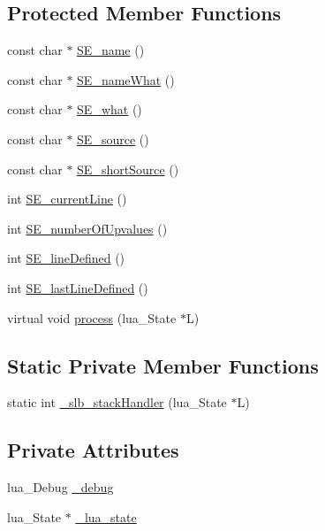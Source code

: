 \subsection*{Protected Member Functions}
\begin{DoxyCompactItemize}
\item 
const char $\ast$ \hyperlink{classSLB_1_1ErrorHandler_aa3f338107ee43be8294e11fb0ea6e207}{S\+E\+\_\+name} ()
\item 
const char $\ast$ \hyperlink{classSLB_1_1ErrorHandler_afa522eeaeffb0908d022be51d8f8258d}{S\+E\+\_\+name\+What} ()
\item 
const char $\ast$ \hyperlink{classSLB_1_1ErrorHandler_a3bdf56691d5ec9fdd0d323b80a478fbc}{S\+E\+\_\+what} ()
\item 
const char $\ast$ \hyperlink{classSLB_1_1ErrorHandler_a110faeb3ce24122ba6c64fd6dae023f8}{S\+E\+\_\+source} ()
\item 
const char $\ast$ \hyperlink{classSLB_1_1ErrorHandler_a8cddf55c3a685560b7b9ad1ee2fa8bfe}{S\+E\+\_\+short\+Source} ()
\item 
int \hyperlink{classSLB_1_1ErrorHandler_afc4935f3cf365a9f202efc6b0de482b1}{S\+E\+\_\+current\+Line} ()
\item 
int \hyperlink{classSLB_1_1ErrorHandler_ace78a5fa80a2ff645d1c1fc62672b85b}{S\+E\+\_\+number\+Of\+Upvalues} ()
\item 
int \hyperlink{classSLB_1_1ErrorHandler_aa95537fa320f5ea906bce156ea85ac6a}{S\+E\+\_\+line\+Defined} ()
\item 
int \hyperlink{classSLB_1_1ErrorHandler_acaf6c28628cf7186680a6b6f7ff1a656}{S\+E\+\_\+last\+Line\+Defined} ()
\item 
virtual void \hyperlink{classSLB_1_1ErrorHandler_a320773f98386e81f2a5fc123e3c8285a}{process} (lua\+\_\+\+State $\ast$L)
\end{DoxyCompactItemize}
\subsection*{Static Private Member Functions}
\begin{DoxyCompactItemize}
\item 
static int \hyperlink{classSLB_1_1ErrorHandler_a331ee2d938082c05b58273d7d4fe3682}{\+\_\+slb\+\_\+stack\+Handler} (lua\+\_\+\+State $\ast$L)
\end{DoxyCompactItemize}
\subsection*{Private Attributes}
\begin{DoxyCompactItemize}
\item 
lua\+\_\+\+Debug \hyperlink{classSLB_1_1ErrorHandler_a3d11337c53985082e82ba2da7e125d45}{\+\_\+debug}
\item 
lua\+\_\+\+State $\ast$ \hyperlink{classSLB_1_1ErrorHandler_ad6be26137f8e4b6094608fdb09095af9}{\+\_\+lua\+\_\+state}
\end{DoxyCompactItemize}


